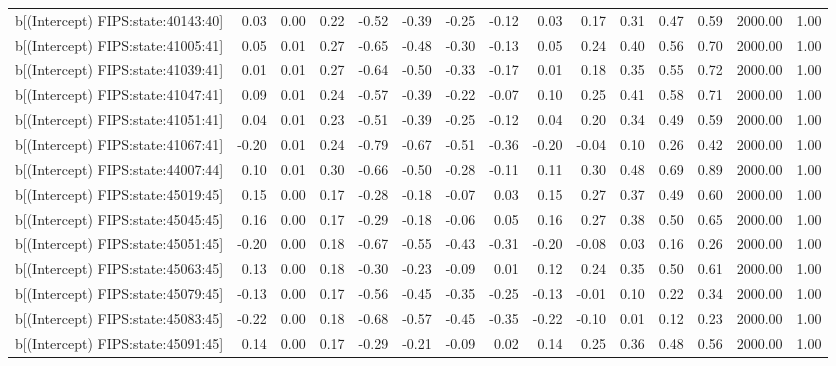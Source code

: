 \begin{table}[ht]
\begin{tabular}{rrrrrrrrrrrrrrr}
  b[(Intercept) FIPS:state:40143:40] & 0.03 & 0.00 & 0.22 & -0.52 & -0.39 & -0.25 & -0.12 & 0.03 & 0.17 & 0.31 & 0.47 & 0.59 & 2000.00 & 1.00 \\ 
  b[(Intercept) FIPS:state:41005:41] & 0.05 & 0.01 & 0.27 & -0.65 & -0.48 & -0.30 & -0.13 & 0.05 & 0.24 & 0.40 & 0.56 & 0.70 & 2000.00 & 1.00 \\ 
  b[(Intercept) FIPS:state:41039:41] & 0.01 & 0.01 & 0.27 & -0.64 & -0.50 & -0.33 & -0.17 & 0.01 & 0.18 & 0.35 & 0.55 & 0.72 & 2000.00 & 1.00 \\ 
  b[(Intercept) FIPS:state:41047:41] & 0.09 & 0.01 & 0.24 & -0.57 & -0.39 & -0.22 & -0.07 & 0.10 & 0.25 & 0.41 & 0.58 & 0.71 & 2000.00 & 1.00 \\ 
  b[(Intercept) FIPS:state:41051:41] & 0.04 & 0.01 & 0.23 & -0.51 & -0.39 & -0.25 & -0.12 & 0.04 & 0.20 & 0.34 & 0.49 & 0.59 & 2000.00 & 1.00 \\ 
  b[(Intercept) FIPS:state:41067:41] & -0.20 & 0.01 & 0.24 & -0.79 & -0.67 & -0.51 & -0.36 & -0.20 & -0.04 & 0.10 & 0.26 & 0.42 & 2000.00 & 1.00 \\ 
  b[(Intercept) FIPS:state:44007:44] & 0.10 & 0.01 & 0.30 & -0.66 & -0.50 & -0.28 & -0.11 & 0.11 & 0.30 & 0.48 & 0.69 & 0.89 & 2000.00 & 1.00 \\ 
  b[(Intercept) FIPS:state:45019:45] & 0.15 & 0.00 & 0.17 & -0.28 & -0.18 & -0.07 & 0.03 & 0.15 & 0.27 & 0.37 & 0.49 & 0.60 & 2000.00 & 1.00 \\ 
  b[(Intercept) FIPS:state:45045:45] & 0.16 & 0.00 & 0.17 & -0.29 & -0.18 & -0.06 & 0.05 & 0.16 & 0.27 & 0.38 & 0.50 & 0.65 & 2000.00 & 1.00 \\ 
  b[(Intercept) FIPS:state:45051:45] & -0.20 & 0.00 & 0.18 & -0.67 & -0.55 & -0.43 & -0.31 & -0.20 & -0.08 & 0.03 & 0.16 & 0.26 & 2000.00 & 1.00 \\ 
  b[(Intercept) FIPS:state:45063:45] & 0.13 & 0.00 & 0.18 & -0.30 & -0.23 & -0.09 & 0.01 & 0.12 & 0.24 & 0.35 & 0.50 & 0.61 & 2000.00 & 1.00 \\ 
  b[(Intercept) FIPS:state:45079:45] & -0.13 & 0.00 & 0.17 & -0.56 & -0.45 & -0.35 & -0.25 & -0.13 & -0.01 & 0.10 & 0.22 & 0.34 & 2000.00 & 1.00 \\ 
  b[(Intercept) FIPS:state:45083:45] & -0.22 & 0.00 & 0.18 & -0.68 & -0.57 & -0.45 & -0.35 & -0.22 & -0.10 & 0.01 & 0.12 & 0.23 & 2000.00 & 1.00 \\ 
  b[(Intercept) FIPS:state:45091:45] & 0.14 & 0.00 & 0.17 & -0.29 & -0.21 & -0.09 & 0.02 & 0.14 & 0.25 & 0.36 & 0.48 & 0.56 & 2000.00 & 1.00 \\ 

\end{tabular}
\end{table}
